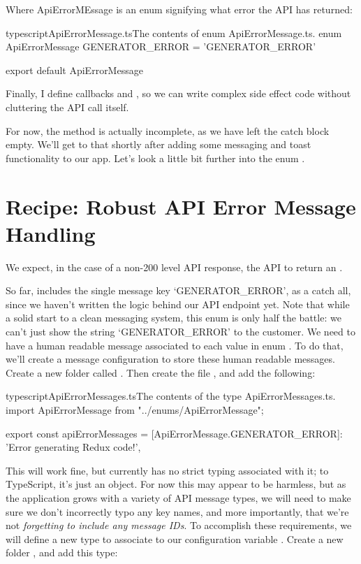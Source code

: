 \documentclass[paper=6in:9in,pagesize=pdftex,headinclude=on,footinclude=on,12pt,twoside]{scrbook}
\begin{document}
Where ApiErrorMEssage is an enum signifying what error the API has returned:

\begin{codeInput}{typescript}{ApiErrorMessage.ts}{The contents of enum ApiErrorMessage.ts.}
enum ApiErrorMessage {
    GENERATOR_ERROR = 'GENERATOR_ERROR'
}

export default ApiErrorMessage
\end{codeInput}

Finally, I define callbacks  and , so we can write complex side effect code without cluttering the API call itself. 

For now, the  method is actually incomplete, as we have left the catch block empty. We'll get to that shortly after adding some messaging and toast functionality to our app. Let's look a little bit further into the enum .

\section{Recipe: Robust API Error Message Handling}

We expect, in the case of a non-200 level API response, the API to return an .

So far,  includes the single message key `GENERATOR\_ERROR', as a catch all, since we haven't written the logic behind our API endpoint yet. Note that while a solid start to a clean messaging system, this enum is only half the battle: we can't just show the string `GENERATOR\_ERROR' to the customer. We need to have a human readable message associated to each value in enum . To do that, we'll create a message configuration to store these human readable messages. Create a new folder called . Then create the file , and add the following:

\begin{codeInput}{typescript}{ApiErrorMessages.ts}{The contents of the type ApiErrorMessages.ts.}
import ApiErrorMessage from "../enums/ApiErrorMessage";

export const apiErrorMessages = {
    [ApiErrorMessage.GENERATOR_ERROR]: 'Error generating Redux code!',
}
\end{codeInput}

This will work fine, but  currently has no strict typing associated with it; to TypeScript, it's just an object. For now this may appear to be harmless, but as the application grows with a variety of API message types, we will need to make sure we don't incorrectly typo any key names, and more importantly, that we're not \textit{forgetting to include any message IDs}. To accomplish these requirements, we will define a new type to associate to our configuration variable . Create a new folder , and add this type:
\end{document}
